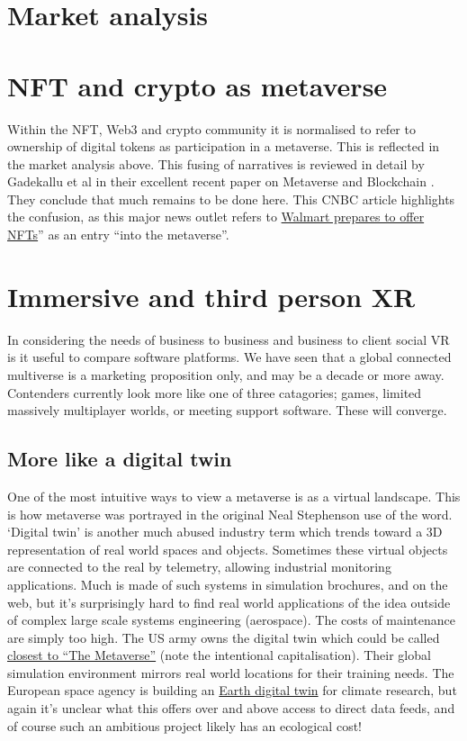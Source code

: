 \section{Market analysis}

\section{NFT and crypto as metaverse}
Within the NFT, Web3 and crypto community it is normalised to refer to ownership of digital tokens as participation in a metaverse. This is reflected in the market analysis above. This fusing of narratives is reviewed in detail by Gadekallu et al in their excellent recent paper on Metaverse and Blockchain \cite{gadekallu2022blockchain}. They conclude that much remains to be done here. This CNBC article highlights the confusion, as this major news outlet refers to \href{https://www.cnbc.com/2022/01/16/walmart-is-quietly-preparing-to-enter-the-metaverse.html}{Walmart prepares to offer NFTs}'' as an entry ``into the metaverse''.
\section{Immersive and third person XR}
In considering the needs of business to business and business to client social VR is it useful to compare software platforms. We have seen that a global connected multiverse is a marketing proposition only, and may be a decade or more away. Contenders currently look more like one of three catagories; games, limited massively multiplayer worlds, or meeting support software. These will converge.
\subsection{More like a digital twin}
One of the most intuitive ways to view a metaverse is as a virtual landscape. This is how metaverse was portrayed in the original Neal Stephenson use of the word. `Digital twin' is another much abused industry term which trends toward a 3D representation of real world spaces and objects. Sometimes these virtual objects are connected to the real by telemetry, allowing industrial monitoring applications. Much is made of such systems in simulation brochures, and on the web, but it's surprisingly hard to find real world applications of the idea outside of complex large scale systems engineering (aerospace). The costs of maintenance are simply too high. The US army owns the digital twin which could be called \href{https://www.army.mil/standto/archive/2018/03/26/}{closest to ``The Metaverse''} (note the intentional capitalisation). Their global simulation environment mirrors real world locations for their training needs. The European space agency is building an \href{}{Earth digital twin} for climate research, but again it's unclear what this offers over and above access to direct data feeds, and of course such an ambitious project likely has an ecological cost!
